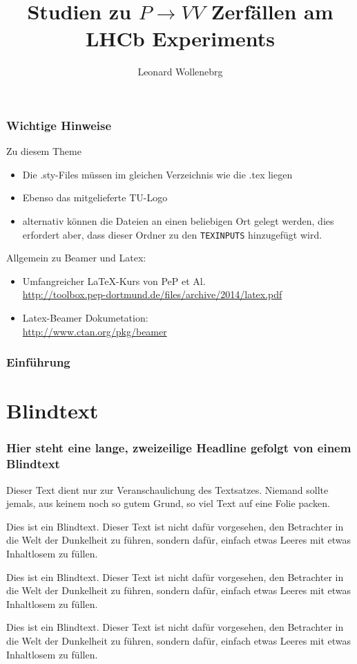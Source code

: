 \documentclass[9pt]{beamer}
\title{Studien zu $P\to VV$ Zerfällen am LHCb Experiments }
\author{Leonard Wollenebrg}
\institute{Experimentelle Physik 5a \\[0.5em] Name der Fakultät}
\begin{document}
\begin{frame}
  \setcounter{framenumber}{0}
  \titlepage
\end{frame}

\begin{frame}
  \frametitle{Wichtige Hinweise}
  Zu diesem Theme
  \begin{itemize}
    \item Die .sty-Files müssen im gleichen Verzeichnis wie die .tex liegen
    \item Ebenso das mitgelieferte TU-Logo
    \item alternativ können die Dateien an einen beliebigen Ort gelegt werden,
    dies erfordert aber, dass dieser Ordner zu den \texttt{TEXINPUTS} hinzugefügt wird.
  \end{itemize}
  Allgemein zu Beamer und Latex:
  \begin{itemize}
    \item Umfangreicher \LaTeX-Kurs von PeP et Al. \\
    \url{http://toolbox.pep-dortmund.de/files/archive/2014/latex.pdf}
    \item Latex-Beamer Dokumetation:\\
    \url{http://www.ctan.org/pkg/beamer}
  \end{itemize}
\end{frame}

\begin{frame}
    \frametitle{Einführung}
    \tableofcontents[pausesections]
\end{frame}

\section{Blindtext}
\begin{frame}
	\frametitle{Hier steht eine lange, zweizeilige Headline
		\newline gefolgt von einem Blindtext}
Dieser Text dient nur zur Veranschaulichung des Textsatzes. Niemand sollte jemals, aus keinem noch so gutem Grund, so viel Text auf eine Folie packen.

Dies ist ein Blindtext. Dieser Text ist nicht dafür vorgesehen, den Betrachter in die Welt der Dunkelheit zu führen, sondern dafür, einfach etwas Leeres mit etwas Inhaltlosem zu füllen.

Dies ist ein Blindtext. Dieser Text ist nicht dafür vorgesehen, den Betrachter in die Welt der Dunkelheit zu führen, sondern dafür, einfach etwas Leeres mit etwas Inhaltlosem zu füllen.

Dies ist ein Blindtext. Dieser Text ist nicht dafür vorgesehen, den Betrachter in die Welt der Dunkelheit zu führen, sondern dafür, einfach etwas Leeres mit etwas Inhaltlosem zu füllen.

\end{frame}
\end{document}
